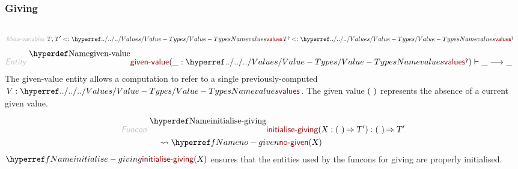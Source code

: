 \subsubsection*{Giving}\hypertarget{giving}{}\label{giving}

\begin{align*}
  [ ~ 
  \KEY{Entity} ~ & \NAMEREF{given-value} \\
  \KEY{Funcon} ~ & \NAMEREF{initialise-giving} \\
  \KEY{Funcon} ~ & \NAMEREF{give} \\
  \KEY{Funcon} ~ & \NAMEREF{given} \\
  \KEY{Funcon} ~ & \NAMEREF{no-given} \\
  \KEY{Funcon} ~ & \NAMEREF{left-to-right-map} \\
  \KEY{Funcon} ~ & \NAMEREF{interleave-map} \\
  \KEY{Funcon} ~ & \NAMEREF{left-to-right-repeat} \\
  \KEY{Funcon} ~ & \NAMEREF{interleave-repeat} \\
  \KEY{Funcon} ~ & \NAMEREF{left-to-right-filter} \\
  \KEY{Funcon} ~ & \NAMEREF{interleave-filter} \\
  \KEY{Funcon} ~ & \NAMEREF{fold-left} \\
  \KEY{Funcon} ~ & \NAMEREF{fold-right}
  ~ ]
\end{align*}
\begin{align*}
  \KEY{Meta-variables} ~ 
  & \VAR{T}, \VAR{T}' <: \NAMEHYPER{../../../Values}{Value-Types}{values} \VAR{T}\QUERY <: \NAMEHYPER{../../../Values}{Value-Types}{values}\QUERY
\end{align*}
\begin{align*}
  \KEY{Entity} ~ 
  & \NAMEDECL{given-value}(\_ : \NAMEHYPER{../../../Values}{Value-Types}{values}\QUERY) \vdash \_ \TRANS  \_
\end{align*}
The given-value entity allows a computation to refer to a single
  previously-computed $\SHADE{\VAR{V} : \NAMEHYPER{../../../Values}{Value-Types}{values}}$. The given value $\strut(  ~  )\strut$ represents 
  the absence of a current given value.

\begin{align*}
  \KEY{Funcon} ~ 
  & \NAMEDECL{initialise-giving}(\VAR{X} : (  ~  ) \TO \VAR{T}') : (  ~  ) \TO \VAR{T}' \\
  & \quad \leadsto \NAMEREF{no-given}
                     ( \VAR{X} )
\end{align*}
$\SHADE{\NAMEREF{initialise-giving}
           ( \VAR{X} )}$ ensures that the entities used by the funcons for
  giving are properly initialised.

